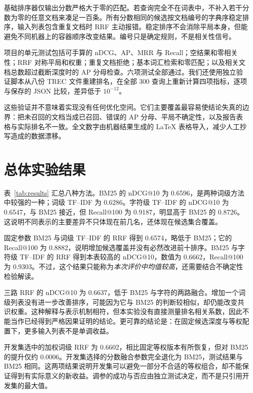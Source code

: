 \documentclass[sigconf,nonacm]{acmart}
\begin{document}
基础排序器仅输出分数严格大于零的匹配。若查询完全不在词表中，不补入若干分数为零的任意文档来凑足一百条。所有分数相同的候选按文档编号的字典序稳定排序，输入列表包含重复文档时 RRF 主动报错。稳定排序不会消除平局本身，但能避免不同机器上的容器顺序改变结果。编号只是确定规则，不是相关性信号。

项目的单元测试包括可手算的 nDCG、AP、MRR 与 Recall；空结果和零相关性；RRF 对称平局和权重；重复文档拒绝；基本词汇检索和零匹配；以及相关文档总数超过截断深度时的 AP 分母检查。六项测试全部通过。我们还使用独立验证脚本从八份 TREC 文件重建排名，在全部 300 查询上重新计算四项指标，逐项与保存的 JSON 比较，差异低于 $10^{-12}$。

这些验证并不意味着实现没有任何优化空间。它们主要覆盖最容易使结论失真的边界：把未召回的文档当成已召回、错误的 AP 分母、平局不确定性，以及报告表格与实际排名不一致。全文数字由机器结果生成的 LaTeX 表格导入，减少人工抄写造成的数据漂移。

\section{总体实验结果}
\begin{table}[t]
\centering

\caption{SciFact 官方 300 个测试查询的结果。所有输入候选深度均为 100。Word 表示词级 TF--IDF，Char 表示字符级 TF--IDF；dev 表示只用开发集选定参数。查询时间含串行基础检索及融合，不含索引构建。}
\label{tab:results}
\end{table}
表~\ref{tab:results} 汇总八种方法。BM25 的 nDCG@10 为 0.6596，是两种词级方法中较强的一种；词级 TF--IDF 为 0.6286。字符级 TF--IDF 的 nDCG@10 为 0.6547，与 BM25 接近，但 Recall@100 为 0.9187，明显高于 BM25 的 0.8726。这说明不同表示的主要差异不只体现在前几名，还体现在候选集合覆盖。

固定参数 BM25 与词级 TF--IDF 的 RRF 得到 0.6574，略低于 BM25；它的 Recall@100 为 0.8882，说明增加候选覆盖并没有必然改进前十排序。BM25 与字符级 TF--IDF 的 RRF 得到本表较高的 nDCG@10，数值为 0.6662，Recall@100 为 0.9303。不过，这个结果只能称为\emph{本次评价中均值较高}，还需要结合不确定性检验解读。

三路 RRF 的 nDCG@10 为 0.6637，低于 BM25 与字符的两路融合。增加一个词级列表没有进一步改善排序，可能因为它与 BM25 的判断较相似，却仍能改变共识权重。这种解释与表示机制相符，但本实验没有直接测量排名相关系数，因此不能当作已经得到严格因果证明的结论。更可靠的结论是：在固定候选深度与等权配置下，更多输入列表不是单调收益。

开发集选中的加权词级 RRF 为 0.6602，相比固定等权版本有所恢复，但对 BM25 的提升仅约 0.0006。开发集选择的分数融合参数完全退化为 BM25，测试结果与 BM25 相同。这两项结果说明开发集可以避免一部分不合适的等权组合，却不能保证得到有实际意义的新收益。调参的成功与否应由独立测试决定，而不是只引用开发集的最大值。
\end{document}
